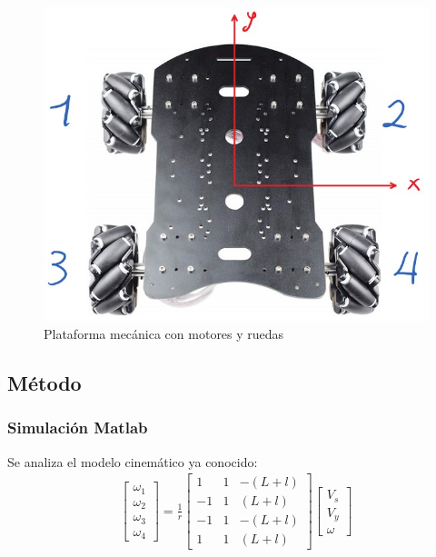 \documentclass[conference]{IEEEtran}
\begin{document}
\begin{figure}
  \includegraphics[width=\linewidth]{figures/plataforma_config.jpg}
  \caption{Plataforma mecánica con motores y ruedas}
  \label{fig:platformmec}
\end{figure}

\subsection{Método}
\subsubsection{Simulación Matlab}
Se analiza el modelo cinemático ya conocido:
\begin{gather}
  \begin{bmatrix} \omega_{1} \\ \omega_{2} \\ \omega_{3} \\ \omega_{4} \end{bmatrix}
  =
  \frac{1}{r}
  \begin{bmatrix}
    1  & 1 & -(L+l) \\
    -1 & 1 & (L+l)  \\
    -1 & 1 & -(L+l) \\
    1  & 1 & (L+l)
  \end{bmatrix}
  \begin{bmatrix} V_{s} \\ V_{y} \\ \omega \end{bmatrix}
\end{gather}
\end{document}

